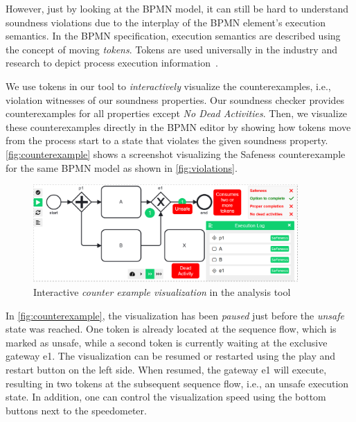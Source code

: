 \documentclass[runningheads]{llncs}
\begin{document}
However, just by looking at the BPMN model, it can still be hard to understand soundness violations due to the interplay of the BPMN element's execution semantics.
In the BPMN specification, execution semantics are described using the concept of moving \textit{tokens}.
Tokens are used universally in the industry and research to depict process execution information~\cite{camundaservicesgmbhBpmnjsTokenSimulation2024,corradiniFormalApproachAnalysis2021,corradiniFormalisingAnimatingMultiple2022,houhouFirstOrderLogicVerification2022,krauterFormalizationAnalysisBPMN2023,krauterHigherorderTransformationApproach2023}.

We use tokens in our tool to \textit{interactively} visualize the counterexamples, i.e., violation witnesses of our soundness properties.
Our soundness checker provides counterexamples for all properties except \textit{No Dead Activities}.
Then, we visualize these counterexamples directly in the BPMN editor by showing how tokens move from the process start to a state that violates the given soundness property.
\autoref{fig:counterexample} shows a screenshot visualizing the Safeness counterexample for the same BPMN model as shown in \autoref{fig:violations}.

\begin{figure}[ht]
	\centering
	\includegraphics[width=0.9\textwidth]{images/counter-example}
	\caption{Interactive \textit{counter example visualization} in the analysis tool}
	\label{fig:counterexample}
\end{figure}

In \autoref{fig:counterexample}, the visualization has been \textit{paused} just before the \textit{unsafe} state was reached.
One token is already located at the sequence flow, which is marked as unsafe, while a second token is currently waiting at the exclusive gateway \textsf{e1}.
The visualization can be resumed or restarted using the play and restart button on the left side.
When resumed, the gateway \textsf{e1} will execute, resulting in two tokens at the subsequent sequence flow, i.e., an unsafe execution state.
In addition, one can control the visualization speed using the bottom buttons next to the speedometer.
\end{document}
